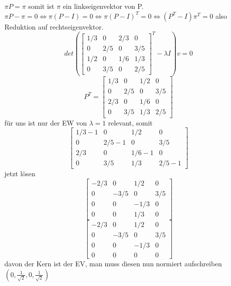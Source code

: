 \documentclass{article}
\begin{document}
	$\pi P = \pi$ somit ist $\pi$ ein linkseigenvektor von P.\\
	$\pi P-\pi = 0\iff \pi(P-I)=0 \iff \pi(P-I)^T =0\iff (P^T-I)\pi^T =0$ also Reduktion auf rechtseigenvektor.\\
	\[det(\begin{bmatrix}1/3&0&2/3&0\\0&2/5&0&3/5\\1/2&0&1/6&1/3\\0&3/5&0&2/5 \end{bmatrix}^T -\lambda I)v=0\]
	\[P^T = \begin{bmatrix}1/3&0&1/2&0\\0&2/5&0&3/5\\2/3&0&1/6&0\\0&3/5&1/3&2/5 \end{bmatrix}\]
	für uns ist nur der EW von $\lambda = 1$ relevant, somit
	\[\begin{bmatrix}1/3-1&0&1/2&0\\0&2/5-1&0&3/5\\2/3&0&1/6-1&0\\0&3/5&1/3&2/5-1 \end{bmatrix}\]
	jetzt lösen
	\[\begin{bmatrix}
	-2/3&0&1/2&0\\
	0&-3/5&0&3/5\\
	0&0&-1/3&0\\
	0&0&1/3&0 \end{bmatrix}\]
	\[\begin{bmatrix}
	-2/3&0&1/2&0\\
	0&-3/5&0&3/5\\
	0&0&-1/3&0\\
	0&0&0&0 \end{bmatrix}\]
	davon der Kern ist der EV, man muss diesen nun normiert aufschreiben $(0,\frac{1}{\sqrt{2}},0,\frac{1}{\sqrt{2}})$\\
\end{document}
